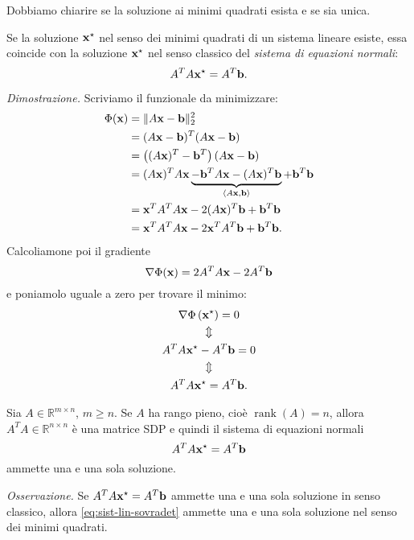 Dobbiamo chiarire se la soluzione ai minimi quadrati esista e se sia unica.
\begin{lemma}
Se la soluzione $\mathbf{x}^{\star }$ nel senso dei minimi quadrati di un sistema lineare esiste, essa coincide con la soluzione $\mathbf{x}^{\star }$ nel senso classico del \textit{sistema di equazioni normali}:
\begin{equation*}
A^{T} A\mathbf{x}^{\star } =A^{T}\mathbf{b}.
\end{equation*}
\end{lemma}
\textit{Dimostrazione.}
Scriviamo il funzionale da minimizzare:
\begin{align*}
\Phi (\mathbf{x}) & =\Vert A\mathbf{x} -\mathbf{b}\Vert ^{2}_{2}\\
 & =( A\mathbf{x} -\mathbf{b})^{T}( A\mathbf{x} -\mathbf{b})\\
 & =\left(( A\mathbf{x})^{T} -\mathbf{b}^{T}\right)( A\mathbf{x} -\mathbf{b})\\
 & =( A\mathbf{x})^{T} A\mathbf{x}\underbrace{-\mathbf{b}^{T} A\mathbf{x} -( A\mathbf{x})^{T}\mathbf{b}}_{\langle A\mathbf{x} ,\mathbf{b} \rangle } +\mathbf{b}^{T}\mathbf{b}\\
 & =\mathbf{x}^{T} A^{T} A\mathbf{x} -2( A\mathbf{x})^{T}\mathbf{b} +\mathbf{b}^{T}\mathbf{b}\\
 & =\mathbf{x}^{T} A^{T} A\mathbf{x} -2\mathbf{x}^{T} A^{T}\mathbf{b} +\mathbf{b}^{T}\mathbf{b}.
\end{align*}
Calcoliamone poi il gradiente
\begin{equation*}
\nabla \Phi (\mathbf{x}) =2A^{T} A\mathbf{x} -2A^{T}\mathbf{b}
\end{equation*}
e poniamolo uguale a zero per trovare il minimo:
\begin{gather*}
\nabla \Phi \left(\mathbf{x}^{\star }\right) =0\\
\Updownarrow \\
A^{T} A\mathbf{x}^{\star } -A^{T}\mathbf{b} =0\\
\Updownarrow \\
A^{T} A\mathbf{x}^{\star } =A^{T}\mathbf{b}.
\end{gather*}
\begin{theorem}
Sia $A\in \mathbb{R}^{m\times n}$, $m\geqslant n$.
Se $A$ ha rango pieno, cioè $\operatorname{rank}(A) =n$, allora $A^{T} A\in \mathbb{R}^{n\times n}$ è una matrice SDP e quindi il sistema di equazioni normali
\begin{equation*}
A^{T} A\mathbf{x}^{\star } =A^{T}\mathbf{b}
\end{equation*}
ammette una e una sola soluzione.
\end{theorem}
\textit{Osservazione.} Se $A^{T} A\mathbf{x}^{\star } =A^{T}\mathbf{b}$ ammette una e una sola soluzione in senso classico, allora \eqref{eq:sist-lin-sovradet} ammette una e una sola soluzione nel senso dei minimi quadrati.

